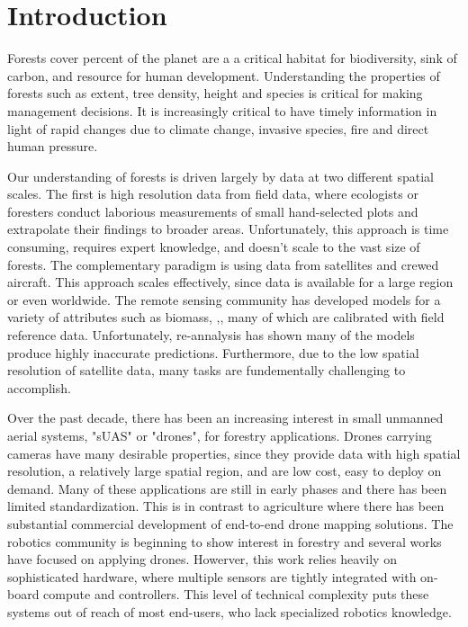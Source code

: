 
\chapter{Introduction} \label{secIntro}
Forests cover \todo{\%} percent of the planet are a a critical habitat for biodiversity, sink of carbon, and resource for human development. Understanding the properties of forests such as extent, tree density, height and species is critical for making management decisions. It is increasingly critical to have timely information in light of rapid changes due to climate change, invasive species, fire and direct human pressure.   

Our understanding of forests is driven largely by data at two different spatial scales. The first is high resolution data from  field data, where ecologists or foresters conduct laborious measurements of small hand-selected plots and extrapolate their findings to broader areas. Unfortunately, this approach is time consuming, requires expert knowledge, and doesn't scale to the vast size of forests. The complementary paradigm is using data from satellites and crewed aircraft. This approach scales effectively, since data is available for a large region or even worldwide. The remote sensing community has developed models for a variety of attributes such as biomass, \todo,, many of which are calibrated with field reference data. Unfortunately, re-annalysis has shown many of the models produce highly inaccurate predictions. Furthermore, due to the low spatial resolution of satellite data, many tasks are fundementally challenging to accomplish.

Over the past decade, there has been an increasing interest in small unmanned aerial systems, "sUAS" or "drones", for forestry applications. Drones carrying cameras have many desirable properties,
 since they provide data with high spatial resolution, a relatively large spatial region, and are low cost, easy to deploy on demand. 
 Many of these applications are still in early phases and there has been limited standardization. This is in contrast to agriculture where there has been substantial commercial development of end-to-end drone mapping solutions. The robotics community is beginning to show interest in forestry and several works have focused on applying drones. Howerver, this work relies heavily on sophisticated hardware, where multiple sensors are tightly integrated with on-board compute and controllers. This level of technical complexity puts these systems out of reach of most end-users, who lack specialized robotics knowledge.

